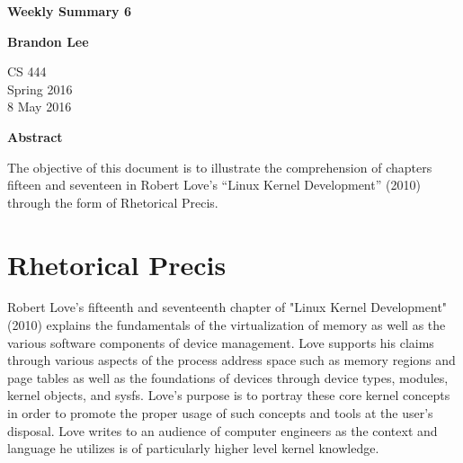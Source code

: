 \documentclass[letterpaper,10pt,titlepage]{article}
\begin{document}
\begin{titlepage}
    \begin{center}
        \vspace*{3.5cm}

        \textbf{Weekly Summary 6}

        \vspace{0.5cm}

        \textbf{Brandon Lee}

        \vspace{0.8cm}

        CS 444\\
        Spring 2016\\
        8 May 2016\\

        \vspace{1cm}

        \textbf{Abstract}\\

        \vspace{0.5cm}

        The objective of this document is to illustrate the comprehension of chapters fifteen and seventeen in Robert Love's “Linux Kernel Development” (2010) through the form of Rhetorical Precis.


        \vfill



    \end{center}
\end{titlepage}

\newpage

\section{Rhetorical Precis}

Robert Love's fifteenth and seventeenth chapter of "Linux Kernel Development" (2010) explains the fundamentals of the virtualization of memory as well as the various software components of device management. Love supports his claims through various aspects of the process address space such as memory regions and page tables as well as the foundations of devices through device types, modules, kernel objects, and sysfs. Love's purpose is to portray these core kernel concepts in order to promote the proper usage of such concepts and tools at the user's disposal. Love writes to an audience of computer engineers as the context and language he utilizes is of particularly higher level kernel knowledge.
\end{document}
